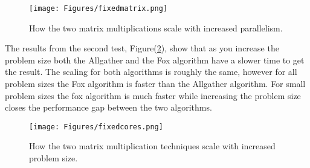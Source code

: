 \documentclass[11pt,a4paper,oneside]{report}
\begin{document}
\begin{figure}[htpb]
  \centering
  \texttt{[image: Figures/fixedmatrix.png]}
  \caption{How the two matrix multiplications scale with increased parallelism.}
  \label{fig:fixedmatrix}
\end{figure}

The results from the second test, Figure(\ref{fig:fixedcores}), show that as you increase the problem size both the Allgather and the Fox algorithm have a slower time to get the result.  The scaling for both algorithms is roughly the same, however for all problem sizes the Fox algorithm is faster than the Allgather algorithm.  For small problem sizes the fox algorithm is much faster while increasing the problem size closes the performance gap between the two algorithms.

\begin{figure}[htpb]
  \centering
  \texttt{[image: Figures/fixedcores.png]}
  \caption{How the two matrix multiplication techniques scale with increased problem size.}
  \label{fig:fixedcores}
\end{figure}
\end{document}
